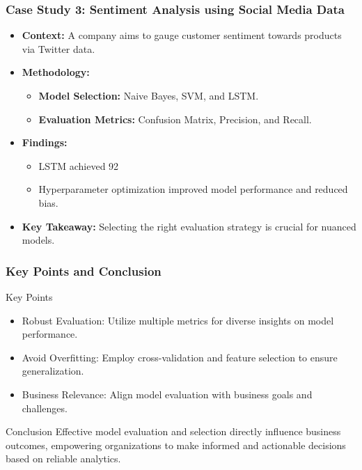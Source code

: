 \documentclass{beamer}
\begin{document}
\begin{frame}[fragile]
    \frametitle{Case Study 3: Sentiment Analysis using Social Media Data}
    \begin{itemize}
        \item \textbf{Context:} A company aims to gauge customer sentiment towards products via Twitter data.
        
        \item \textbf{Methodology:}
            \begin{itemize}
                \item \textbf{Model Selection:} Naive Bayes, SVM, and LSTM.
                \item \textbf{Evaluation Metrics:} Confusion Matrix, Precision, and Recall.
            \end{itemize}
        
        \item \textbf{Findings:}
            \begin{itemize}
                \item LSTM achieved 92%
                \item Hyperparameter optimization improved model performance and reduced bias.
            \end{itemize}
        
        \item \textbf{Key Takeaway:} Selecting the right evaluation strategy is crucial for nuanced models.
    \end{itemize}
\end{frame}

\begin{frame}[fragile]
    \frametitle{Key Points and Conclusion}
    \begin{block}{Key Points}
        \begin{itemize}
            \item Robust Evaluation: Utilize multiple metrics for diverse insights on model performance.
            \item Avoid Overfitting: Employ cross-validation and feature selection to ensure generalization.
            \item Business Relevance: Align model evaluation with business goals and challenges.
        \end{itemize}
    \end{block}
    
    \begin{block}{Conclusion}
        Effective model evaluation and selection directly influence business outcomes, empowering organizations to make informed and actionable decisions based on reliable analytics.
    \end{block}
\end{frame}
\end{document}
